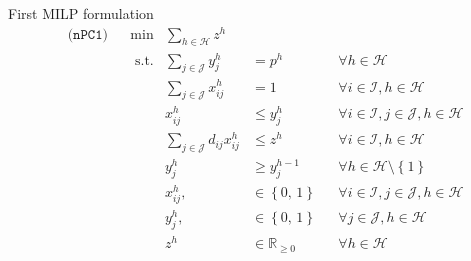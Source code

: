 \documentclass[utf8,aspectratio=169,ngerman,english]{beamer}
\newcommand{\nPC}{\hyperref[eq:nPC]{\texttt{(nPC1)}}}
\begin{document}
\begin{frame}{First MILP formulation}
    \vspace{-31pt}
    \begin{subequations}
        \begin{align}
            &\nPC   &&\min          &\sum_{h \in \mathcal H}    z^{h}                                                                                                                      \label{eq:pc1N-obj}         \\[-3pt]
            &       &&\text{ s.t.}  &\sum_{j \in \mathcal J}    y_{j}^h         & =     p^{h}                           && \forall h \in \mathcal H                                        \label{eq:pc1N-numfac}      \\[-3pt]
            &       &&              &\sum_{j \in \mathcal J}    x_{ij}^h        & =     1                               && \forall i \in \mathcal I, h \in \mathcal H                      \label{eq:pc1N-onetoone}    \\[-6pt]
            &       &&              &                           x_{ij}^h        & \leq  y_j^{h}                         && \forall i \in \mathcal I, j \in \mathcal J, h \in \mathcal H    \label{eq:pc1N-onlyopen}    \\[-1.2pt]
            &       &&              &\sum_{j \in \mathcal J}    d_{ij}x_{ij}^h  & \leq  z^{h}                           && \forall i \in \mathcal I, h \in \mathcal H                      \label{eq:pc1N-zpush}       \\[-10pt]
            &       &&              &                           y_{j}^h         & \geq  y_j^{h-1}                       && \forall h \in \mathcal H \setminus \left \{1 \right \}          \label{eq:pc1N-nested}      \\
            &       &&              &                           x_{ij}^h,\      & \in   \left \{\text{0, 1}\right \}    && \forall i \in \mathcal I, j \in \mathcal J, h \in \mathcal H    \label{eq:pc1N-binx}        \\
            &       &&              &                           y_{j}^h,\       & \in   \left \{\text{0, 1}\right \}    && \forall j \in \mathcal J, h \in \mathcal H                      \label{eq:pc1N-biny}        \\
            &       &&              &                           z^{h}           & \in   \mathbb R_{\ge 0}               && \forall h \in \mathcal H                                        \label{eq:pc1N-zreal} 
        \end{align}  \label{eq:nPC}
    \end{subequations}
\end{frame}
\end{document}
